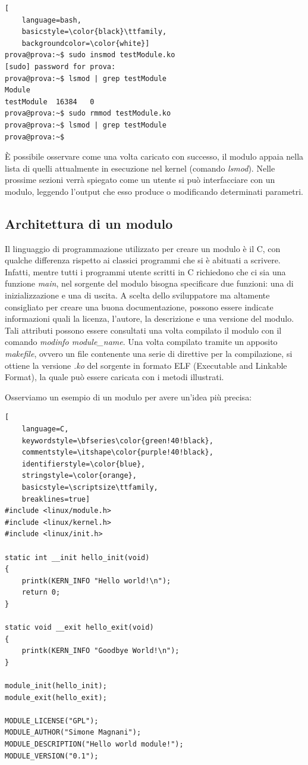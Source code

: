 \begin{lstlisting}[
	language=bash,
	basicstyle=\color{black}\ttfamily,
	backgroundcolor=\color{white}]
prova@prova:~$ sudo insmod testModule.ko
[sudo] password for prova:
prova@prova:~$ lsmod | grep testModule
Module
testModule	16384	0
prova@prova:~$ sudo rmmod testModule.ko
prova@prova:~$ lsmod | grep testModule
prova@prova:~$ 
\end{lstlisting}
È possibile osservare come una volta caricato con successo, il modulo appaia nella lista di quelli attualmente in esecuzione nel kernel (comando \emph{lsmod}). Nelle prossime sezioni verrà spiegato come un utente si può interfacciare con un modulo, leggendo l'output che esso produce o modificando determinati parametri.

\subsection{Architettura di un modulo}
Il linguaggio di programmazione utilizzato per creare un modulo è il C, con qualche differenza rispetto ai classici programmi che si è abituati a scrivere. Infatti, mentre tutti i programmi utente scritti in C richiedono che ci sia una funzione \emph{main}, nel sorgente del modulo bisogna specificare due funzioni: una di inizializzazione e una di uscita.
A scelta dello sviluppatore ma altamente consigliato per creare una buona documentazione, possono essere indicate informazioni quali la licenza, l'autore, la descrizione e una versione del modulo. Tali attributi possono essere consultati una volta compilato il modulo con il comando \emph{modinfo module\_name}.
Una volta compilato tramite un apposito \emph{makefile}, ovvero un file contenente una serie di direttive per la compilazione, si ottiene la versione \emph{.ko} del sorgente in formato ELF (Executable and Linkable Format), la quale può essere caricata con i metodi illustrati.

Osserviamo un esempio di un modulo per avere un'idea più precisa:

\begin{lstlisting}[
	language=C,
  	keywordstyle=\bfseries\color{green!40!black},
  	commentstyle=\itshape\color{purple!40!black},
  	identifierstyle=\color{blue},
  	stringstyle=\color{orange},
    basicstyle=\scriptsize\ttfamily,
    breaklines=true]
#include <linux/module.h>
#include <linux/kernel.h>
#include <linux/init.h>

static int __init hello_init(void)
{
	printk(KERN_INFO "Hello world!\n");
	return 0;
}

static void __exit hello_exit(void)
{
	printk(KERN_INFO "Goodbye World!\n");	
}

module_init(hello_init);
module_exit(hello_exit);

MODULE_LICENSE("GPL");
MODULE_AUTHOR("Simone Magnani");
MODULE_DESCRIPTION("Hello world module!");
MODULE_VERSION("0.1");
\end{lstlisting}

